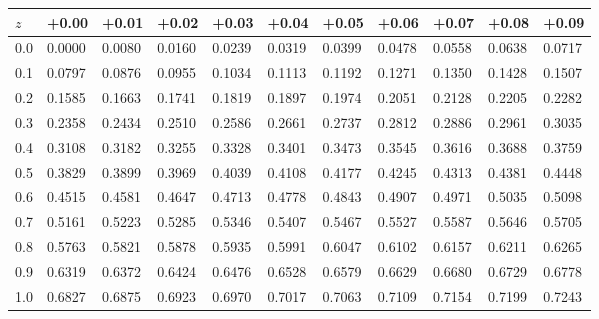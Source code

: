 \begin{tabular}{l|llllllllll}
\toprule
$z$  & +0.00 & +0.01 & +0.02 & +0.03 & +0.04 & +0.05 & +0.06 & +0.07 & +0.08 & +0.09 \\
\midrule
0.0 & \cellcolor{gray!20}0.0000 & \cellcolor{gray!20}0.0080 & \cellcolor{gray!20}0.0160 & \cellcolor{gray!20}0.0239 & \cellcolor{gray!20}0.0319 & \cellcolor{gray!20}0.0399 & \cellcolor{gray!20}0.0478 & \cellcolor{gray!20}0.0558 & \cellcolor{gray!20}0.0638 & \cellcolor{gray!20}0.0717 \\
0.1 & 0.0797 & 0.0876 & 0.0955 & 0.1034 & 0.1113 & 0.1192 & 0.1271 & 0.1350 & 0.1428 & 0.1507 \\
0.2 & \cellcolor{gray!20}0.1585 & \cellcolor{gray!20}0.1663 & \cellcolor{gray!20}0.1741 & \cellcolor{gray!20}0.1819 & \cellcolor{gray!20}0.1897 & \cellcolor{gray!20}0.1974 & \cellcolor{gray!20}0.2051 & \cellcolor{gray!20}0.2128 & \cellcolor{gray!20}0.2205 & \cellcolor{gray!20}0.2282 \\
0.3 & 0.2358 & 0.2434 & 0.2510 & 0.2586 & 0.2661 & 0.2737 & 0.2812 & 0.2886 & 0.2961 & 0.3035 \\
0.4 & \cellcolor{gray!20}0.3108 & \cellcolor{gray!20}0.3182 & \cellcolor{gray!20}0.3255 & \cellcolor{gray!20}0.3328 & \cellcolor{gray!20}0.3401 & \cellcolor{gray!20}0.3473 & \cellcolor{gray!20}0.3545 & \cellcolor{gray!20}0.3616 & \cellcolor{gray!20}0.3688 & \cellcolor{gray!20}0.3759 \\
0.5 & 0.3829 & 0.3899 & 0.3969 & 0.4039 & 0.4108 & 0.4177 & 0.4245 & 0.4313 & 0.4381 & 0.4448 \\
0.6 & \cellcolor{gray!20}0.4515 & \cellcolor{gray!20}0.4581 & \cellcolor{gray!20}0.4647 & \cellcolor{gray!20}0.4713 & \cellcolor{gray!20}0.4778 & \cellcolor{gray!20}0.4843 & \cellcolor{gray!20}0.4907 & \cellcolor{gray!20}0.4971 & \cellcolor{gray!20}0.5035 & \cellcolor{gray!20}0.5098 \\
0.7 & 0.5161 & 0.5223 & 0.5285 & 0.5346 & 0.5407 & 0.5467 & 0.5527 & 0.5587 & 0.5646 & 0.5705 \\
0.8 & \cellcolor{gray!20}0.5763 & \cellcolor{gray!20}0.5821 & \cellcolor{gray!20}0.5878 & \cellcolor{gray!20}0.5935 & \cellcolor{gray!20}0.5991 & \cellcolor{gray!20}0.6047 & \cellcolor{gray!20}0.6102 & \cellcolor{gray!20}0.6157 & \cellcolor{gray!20}0.6211 & \cellcolor{gray!20}0.6265 \\
0.9 & 0.6319 & 0.6372 & 0.6424 & 0.6476 & 0.6528 & 0.6579 & 0.6629 & 0.6680 & 0.6729 & 0.6778 \\
1.0 & \cellcolor{gray!20}0.6827 & \cellcolor{gray!20}0.6875 & \cellcolor{gray!20}0.6923 & \cellcolor{gray!20}0.6970 & \cellcolor{gray!20}0.7017 & \cellcolor{gray!20}0.7063 & \cellcolor{gray!20}0.7109 & \cellcolor{gray!20}0.7154 & \cellcolor{gray!20}0.7199 & \cellcolor{gray!20}0.7243 \\
\bottomrule
\end{tabular}
